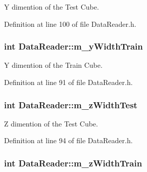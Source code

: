Y dimention of the Test Cube. 



Definition at line 100 of file Data\+Reader.\+h.

\subsubsection[{\texorpdfstring{m\+\_\+y\+Width\+Train}{m_yWidthTrain}}]{\setlength{\rightskip}{0pt plus 5cm}int Data\+Reader\+::m\+\_\+y\+Width\+Train\hspace{0.3cm}{\ttfamily [private]}}\hypertarget{classDataReader_a4a627c7884969007b149ce1023ee3e11}{}\label{classDataReader_a4a627c7884969007b149ce1023ee3e11}


Y dimention of the Train Cube. 



Definition at line 91 of file Data\+Reader.\+h.

\subsubsection[{\texorpdfstring{m\+\_\+z\+Width\+Test}{m_zWidthTest}}]{\setlength{\rightskip}{0pt plus 5cm}int Data\+Reader\+::m\+\_\+z\+Width\+Test\hspace{0.3cm}{\ttfamily [private]}}\hypertarget{classDataReader_a2c029cc64a4c674ee19477c9bfcc2ae6}{}\label{classDataReader_a2c029cc64a4c674ee19477c9bfcc2ae6}


Z dimention of the Test Cube. 



Definition at line 94 of file Data\+Reader.\+h.

\subsubsection[{\texorpdfstring{m\+\_\+z\+Width\+Train}{m_zWidthTrain}}]{\setlength{\rightskip}{0pt plus 5cm}int Data\+Reader\+::m\+\_\+z\+Width\+Train\hspace{0.3cm}{\ttfamily [private]}}\hypertarget{classDataReader_ae74053a5592498d373fc12254145ce39}{}\label{classDataReader_ae74053a5592498d373fc12254145ce39}



